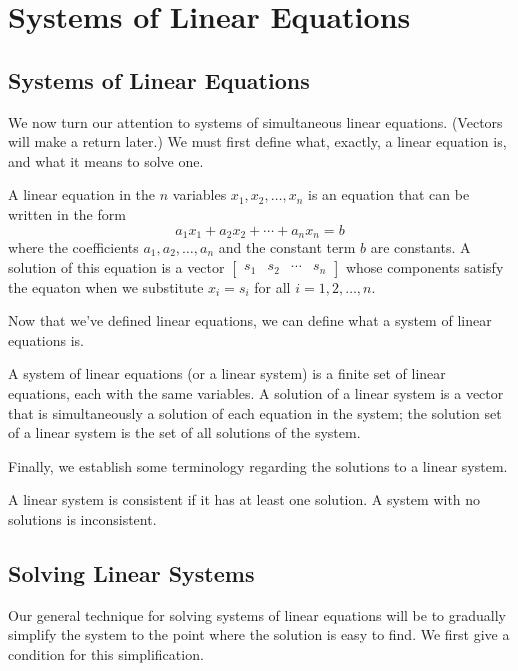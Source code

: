 \documentclass[../m73main.tex]{subfiles}
\begin{document}
\chapter{Systems of Linear Equations}

\section{Systems of Linear Equations}
We now turn our attention to systems of simultaneous linear equations.
(Vectors will make a return later.)
We must first define what, exactly, a linear equation is, and what it means to solve one.

\begin{definition}
	A linear equation in the $n$ variables $x_1, x_2, \ldots, x_n$ is an equation that can be written in the form
	\[ a_1 x_1 + a_2 x_2 + \cdots + a_n x_n = b \]
	where the coefficients $a_1, a_2, \ldots, a_n$ and the constant term $b$ are constants.
	A solution of this equation is a vector $\begin{bmatrix} s_1 & s_2 & \cdots & s_n \end{bmatrix}$ whose components satisfy the equaton when we substitute $x_i = s_i$ for all $i = 1, 2, \ldots, n$.
\end{definition}

Now that we've defined linear equations, we can define what a system of linear equations is.

\begin{definition}
	A system of linear equations (or a linear system) is a finite set of linear equations, each with the same variables.
	A solution of a linear system is a vector that is simultaneously a solution of each equation in the system; the solution set of a linear system is the set of all solutions of the system.
\end{definition}

Finally, we establish some terminology regarding the solutions to a linear system.

\begin{definition}
	A linear system is consistent if it has at least one solution.
	A system with no solutions is inconsistent.
\end{definition}

\section{Solving Linear Systems}
Our general technique for solving systems of linear equations will be to gradually simplify the system to the point where the solution is easy to find.
We first give a condition for this simplification.
\end{document}
